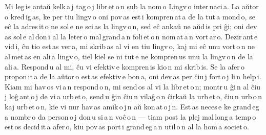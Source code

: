 Mi leg\,is antaŭ kelk\,a\,j tag\,o\,j libr\,et\,o\,n sub la nom\,o \glqq{}Lingv\,o inter\,naci\,a\grqq{}. La aŭtor\,o kred\,ig\,as, ke per tiu lingv\,o oni pov\,as est\,i kompren\,at\,a de la tut\,a mond\,o, se eĉ la adres\,it\,o ne sol\,e ne sci\,as la lingv\,o\,n, sed eĉ ankaŭ ne aŭd\,is pri ĝi; oni dev\,as sol\,e al\,don\,i al la leter\,o mal\,grand\,a\,n foli\,et\,o\,n nom\,at\,a\,n \glqq{}vort\,ar\,o\grqq{}. Dezir\,ant\,e vid\,i, ĉu tio est\,as ver\,a, mi skrib\,as al vi en tiu lingv\,o, kaj mi eĉ unu vort\,o\,n ne al\,met\,as en ali\,a lingv\,o, tiel kiel se ni tut\,e ne kompren\,us unu la lingv\,o\,n de la ali\,a. Respond\,u al mi, ĉu vi efektiv\,e kompren\,is kio\,n mi skrib\,is. Se la afer\,o propon\,it\,a de la aŭtor\,o est\,as efektiv\,e bon\,a, oni dev\,as per ĉiu\,j fort\,o\,j li\,n help\,i. Kiam mi hav\,os vi\,a\,n respond\,o\,n, mi send\,os al vi la libr\,et\,o\,n; montr\,u ĝi\,n al ĉiu\,j loĝ\,ant\,o\,j de vi\,a urb\,et\,o, send\,u ĝin ĉiu\,n vilaĝ\,o\,n ĉirkaŭ la urb\,et\,o, ĉiu\,n urb\,o\,n kaj urb\,et\,o\,n, kie vi nur hav\,as amik\,o\,j\,n aŭ kon\,at\,o\,j\,n. Est\,as neces\,e ke grand\,eg\,a nombr\,o da person\,o\,j don\,u si\,a\,n voĉ\,o\,n --- tiam post la plej mal\,long\,a temp\,o est\,os decid\,it\,a afer\,o, kiu pov\,as port\,i grand\,eg\,a\,n util\,o\,n al la hom\,a societ\,o.



